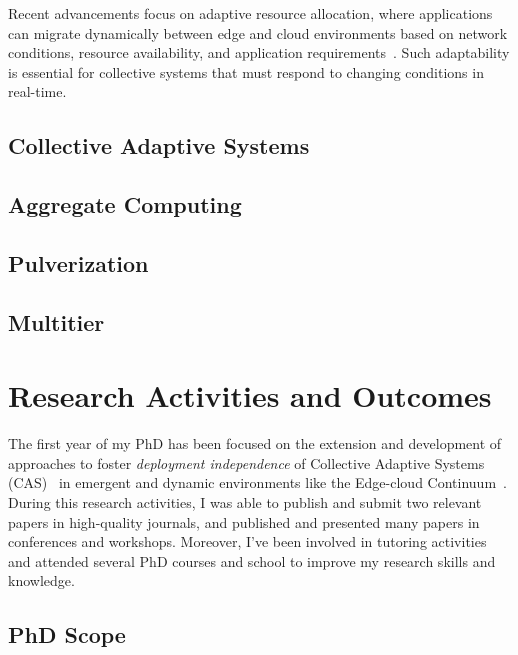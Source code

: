 \documentclass[runningheads]{llncs}
\begin{document}
Recent advancements focus on adaptive resource allocation,
where applications can migrate dynamically between edge and cloud environments based on network conditions,
resource availability,
and application requirements~\cite{DBLP:journals/fgcs/RomanLM18}.
%
Such adaptability is essential for collective systems that must respond to changing conditions in real-time.

\subsection{Collective Adaptive Systems}
\label{sec:cas}

\subsection{Aggregate Computing}
\label{sec:aggregate-computing}

\subsection{Pulverization}
\label{sec:pulverization}

\subsection{Multitier}
\label{sec:multitier}

\section{Research Activities and Outcomes}
\label{sec:research-activities}

The first year of my PhD has been focused on the extension and development of approaches to foster \emph{deployment independence} of Collective Adaptive Systems (CAS)~\cite{DBLP:conf/birthday/BucchiaroneM19} in emergent and dynamic environments like the Edge-cloud Continuum~\cite{DBLP:journals/access/MoreschiniPLNHT22}.
%
During this research activities,
I was able to publish and submit two relevant papers in high-quality journals,
and published and presented many papers in conferences and workshops.
%
Moreover,
I've been involved in tutoring activities and attended several PhD courses and school to improve my research skills and knowledge.

\subsection{PhD Scope}
\end{document}
